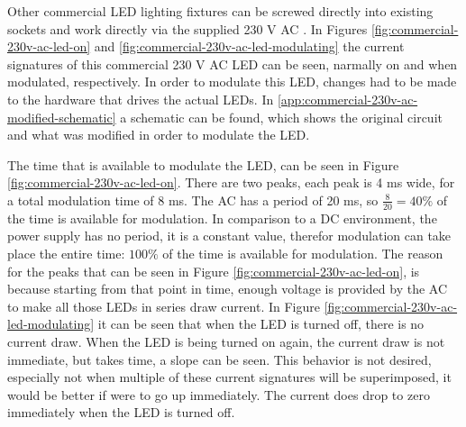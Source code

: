 Other commercial LED lighting fixtures can be screwed directly into existing sockets and work directly via the supplied 230 V AC \cite{commercial-230v-ac-led-aliexpress}.
In Figures \ref{fig:commercial-230v-ac-led-on} and \ref{fig:commercial-230v-ac-led-modulating} the current signatures of this commercial 230 V AC LED can be seen, narmally on and when modulated, respectively.
In order to modulate this LED, changes had to be made to the hardware that drives the actual LEDs.
In \autoref{app:commercial-230v-ac-modified-schematic} a schematic can be found, which shows the original circuit and what was modified in order to modulate the LED.









The time that is available to modulate the LED, can be seen in Figure \ref{fig:commercial-230v-ac-led-on}.
There are two peaks, each peak is 4 ms wide, for a total modulation time of 8 ms.
The AC has a period of 20 ms, so $\frac{8}{20} = 40 \%$ of the time is available for modulation.
In comparison to a DC environment, the power supply has no period, it is a constant value, therefor modulation can take place the entire time: $100 \%$ of the time is available for modulation.
The reason for the peaks that can be seen in Figure \ref{fig:commercial-230v-ac-led-on}, is because starting from that point in time, enough voltage is provided by the AC to make all those LEDs in series draw current.
In Figure \ref{fig:commercial-230v-ac-led-modulating} it can be seen that when the LED is turned off, there is no current draw.
When the LED is being turned on again, the current draw is not immediate, but takes time, a slope can be seen.
This behavior is not desired, especially not when multiple of these current signatures will be superimposed, it would be better if were to go up immediately.
The current does drop to zero immediately when the LED is turned off.

